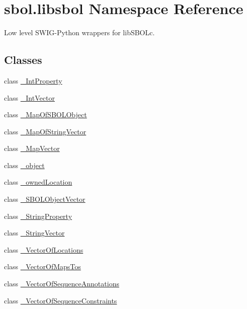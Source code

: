 \hypertarget{namespacesbol_1_1libsbol}{}\section{sbol.\+libsbol Namespace Reference}
\label{namespacesbol_1_1libsbol}


Low level S\+W\+I\+G-\/\+Python wrappers for lib\+S\+B\+O\+Lc.  


\subsection*{Classes}
\begin{DoxyCompactItemize}
\item 
class \hyperlink{classsbol_1_1libsbol_1_1___int_property}{\+\_\+\+Int\+Property}
\item 
class \hyperlink{classsbol_1_1libsbol_1_1___int_vector}{\+\_\+\+Int\+Vector}
\item 
class \hyperlink{classsbol_1_1libsbol_1_1___map_of_s_b_o_l_object}{\+\_\+\+Map\+Of\+S\+B\+O\+L\+Object}
\item 
class \hyperlink{classsbol_1_1libsbol_1_1___map_of_string_vector}{\+\_\+\+Map\+Of\+String\+Vector}
\item 
class \hyperlink{classsbol_1_1libsbol_1_1___map_vector}{\+\_\+\+Map\+Vector}
\item 
class \hyperlink{classsbol_1_1libsbol_1_1__object}{\+\_\+object}
\item 
class \hyperlink{classsbol_1_1libsbol_1_1__owned_location}{\+\_\+owned\+Location}
\item 
class \hyperlink{classsbol_1_1libsbol_1_1___s_b_o_l_object_vector}{\+\_\+\+S\+B\+O\+L\+Object\+Vector}
\item 
class \hyperlink{classsbol_1_1libsbol_1_1___string_property}{\+\_\+\+String\+Property}
\item 
class \hyperlink{classsbol_1_1libsbol_1_1___string_vector}{\+\_\+\+String\+Vector}
\item 
class \hyperlink{classsbol_1_1libsbol_1_1___vector_of_locations}{\+\_\+\+Vector\+Of\+Locations}
\item 
class \hyperlink{classsbol_1_1libsbol_1_1___vector_of_maps_tos}{\+\_\+\+Vector\+Of\+Maps\+Tos}
\item 
class \hyperlink{classsbol_1_1libsbol_1_1___vector_of_sequence_annotations}{\+\_\+\+Vector\+Of\+Sequence\+Annotations}
\item 
class \hyperlink{classsbol_1_1libsbol_1_1___vector_of_sequence_constraints}{\+\_\+\+Vector\+Of\+Sequence\+Constraints}

\end{DoxyCompactItemize}
